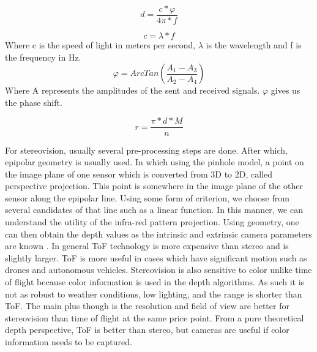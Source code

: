 \begin{equation}
	d = \frac{c * \varphi}{4\pi * f}
\end{equation}


\begin{equation}
c = \lambda * f
\end{equation}
Where c is the speed of light in meters per second, $\lambda$ is the wavelength and f is the frequency in Hz.
\begin{equation}
	\varphi = ArcTan(\frac{A_1 - A_3}{A_2 - A_4})
\end{equation}
Where A represents the amplitudes of the sent and received signals. $\varphi$ gives us the phase shift.

\begin{equation}
	r = \frac{\pi * d * M}{n}
\end{equation}

For stereovision, usually several pre-processing steps are done. After which, epipolar geometry is usually used. In which using the pinhole model, a point on the image plane of one sensor which is converted from 3D to 2D, called perspective projection. This point is somewhere in the image plane of the other sensor along the epipolar line. Using some form of criterion, we choose from several candidates of that line such as a linear function. In this manner, we can understand the utility of the infra-red pattern projection. Using geometry, one can then obtain the depth values as the intrinsic and extrinsic camera parameters are known \cite{ayache1988rectification}. In general ToF technology is more expensive than stereo and is slightly larger. ToF is more useful in cases which have significant motion such as drones and autonomous vehicles. Stereovision is also sensitive to color unlike time of flight because color information is used in the depth algorithms. As such it is not as robust to weather conditions, low lighting, and the range is shorter than ToF. The main plus though is the resolution and field of view are better for stereovision than time of flight at the same price point. From a pure theoretical depth perspective, ToF is better than stereo, but cameras are useful if color information needs to be captured.

